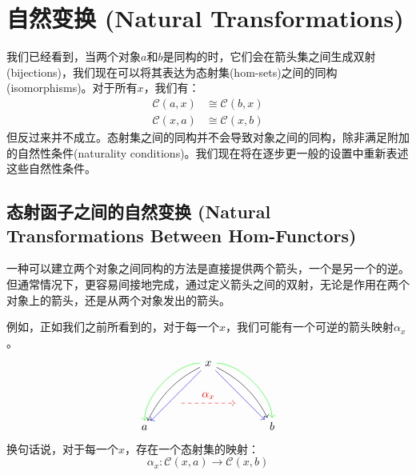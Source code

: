 \documentclass[DaoFP]{subfiles}
\begin{document}
    \setcounter{chapter}{8}

    \chapter{自然变换 (Natural Transformations)}

    我们已经看到，当两个对象$a$和$b$是同构的时，它们会在箭头集之间生成双射(bijections)，我们现在可以将其表达为态射集(hom-sets)之间的同构(isomorphisms)。对于所有$x$，我们有：
    \begin{align*}
        \mathcal{C}(a, x) &\cong \mathcal{C}(b, x) \\
        \mathcal{C}(x, a) &\cong \mathcal{C}(x, b)
    \end{align*}
    但反过来并不成立。态射集之间的同构并不会导致对象之间的同构，除非满足附加的自然性条件(naturality conditions)。我们现在将在逐步更一般的设置中重新表述这些自然性条件。

    \section{态射函子之间的自然变换 (Natural Transformations Between Hom-Functors)}

    一种可以建立两个对象之间同构的方法是直接提供两个箭头，一个是另一个的逆。但通常情况下，更容易间接地完成，通过定义箭头之间的双射，无论是作用在两个对象上的箭头，还是从两个对象发出的箭头。

    例如，正如我们之前所看到的，对于每一个$x$，我们可能有一个可逆的箭头映射$\alpha_x$。
    \[
        \begin{tikzcd}
            \node(x) at (0, 2) {x};
            \node(a) at (-2, 0) {a};
            \node(b) at (2, 0) {b};
            \node(c1) at (-1, 1.5) {};
            \node(c2) at (-1.5, 1) {};
            \node(c3) at (-1, 2) {};
            \node(c4) at (-2, 1) {};
            \node(d1) at (1, 1.5) {};
            \node(d2) at (1.5, 1) {};
            \node(d3) at (1, 2) {};
            \node(d4) at (2, 1) {};
            \node (aa) at (-1, 0.75) {};
            \node (bb) at (1, 0.75) {};
            \draw[->] (x) .. controls (c1)  and (c2) .. (a); %
            \draw[->, green] (x) .. controls (c3)  and (c4) .. (a); %
            \draw[->, blue] (x) -- (a);
            \draw[->] (x) .. controls (d1)  and (d2) .. (b); %
            \draw[->, green] (x) .. controls (d3)  and (d4) .. (b); %
            \draw[->, blue] (x) -- (b);
            \draw[->, red, dashed] (aa) -- node[above]{\alpha_x} (bb);
        \end{tikzcd}
    \]
    换句话说，对于每一个$x$，存在一个态射集的映射：
    \[ \alpha_x \colon \mathcal{C}(x, a) \to \mathcal{C}(x, b) \]
\end{document}
